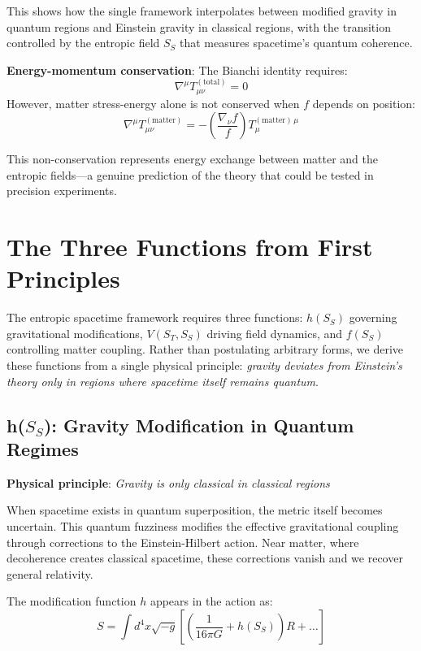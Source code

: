 \documentclass[12pt]{article}
\begin{document}
This shows how the single framework interpolates between modified gravity in quantum regions and Einstein gravity in classical regions, with the transition controlled by the entropic field $S_S$ that measures spacetime's quantum coherence.

\textbf{Energy-momentum conservation}: The Bianchi identity requires:
\begin{equation}
    \nabla^\mu T^{(\mathrm{total})}_{\mu\nu} = 0
\end{equation}
However, matter stress-energy alone is not conserved when $f$ depends on position:
\begin{equation}
    \nabla^\mu T^{(\mathrm{matter})}_{\mu\nu}
    = - \left( \frac{\nabla_\nu f}{f} \right) T^{(\mathrm{matter})\,\mu}_{\mu}
\end{equation}

This non-conservation represents energy exchange between matter and the entropic fields---a genuine prediction of the theory that could be tested in precision experiments.

\section{The Three Functions from First Principles}

The entropic spacetime framework requires three functions: $h(S_S)$ governing gravitational modifications, $V(S_T, S_S)$ driving field dynamics, and $f(S_S)$ controlling matter coupling. Rather than postulating arbitrary forms, we derive these functions from a single physical principle: \emph{gravity deviates from Einstein's theory only in regions where spacetime itself remains quantum}.

\subsection{h($S_S$): Gravity Modification in Quantum Regimes}

\textbf{Physical principle}: \emph{Gravity is only classical in classical regions}

When spacetime exists in quantum superposition, the metric itself becomes uncertain. This quantum fuzziness modifies the effective gravitational coupling through corrections to the Einstein-Hilbert action. Near matter, where decoherence creates classical spacetime, these corrections vanish and we recover general relativity.

The modification function $h$ appears in the action as:
\begin{equation}
    S = \int d^4x \sqrt{-g} \left[ \left( \frac{1}{16\pi G} + h(S_S) \right) R + \ldots \right]
\end{equation}
\end{document}
